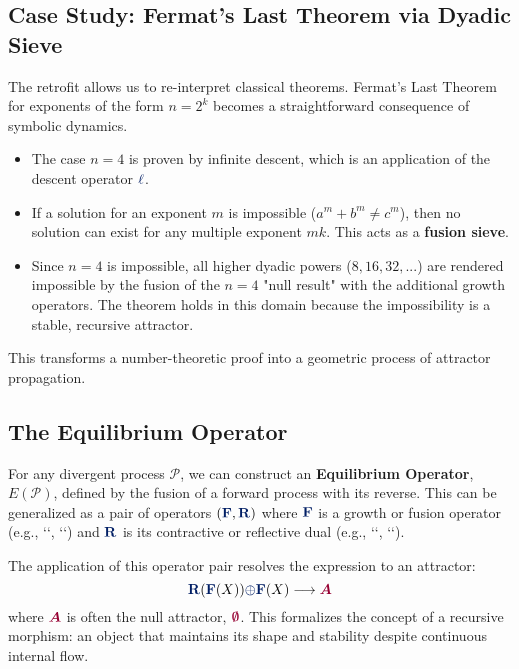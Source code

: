 \subsection{Case Study: Fermat's Last Theorem via Dyadic Sieve}
The retrofit allows us to re-interpret classical theorems. Fermat's Last Theorem for exponents of the form $n=2^k$ becomes a straightforward consequence of symbolic dynamics.
\begin{itemize}
    \item The case $n=4$ is proven by infinite descent, which is an application of the descent operator $\lha$.
    \item If a solution for an exponent $m$ is impossible ($a^m+b^m \neq c^m$), then no solution can exist for any multiple exponent $mk$. This acts as a \textbf{fusion sieve}.
    \item Since $n=4$ is impossible, all higher dyadic powers ($8, 16, 32, ...$) are rendered impossible by the fusion of the $n=4$ "null result" with the additional growth operators. The theorem holds in this domain because the impossibility is a stable, recursive attractor.
\end{itemize}
This transforms a number-theoretic proof into a geometric process of attractor propagation.

\subsection{The Equilibrium Operator}
For any divergent process $\mathcal{P}$, we can construct an \textbf{Equilibrium Operator}, $E(\mathcal{P})$, defined by the fusion of a forward process with its reverse. This can be generalized as a pair of operators $(\op{F}, \op{R})$ where $\op{F}$ is a growth or fusion operator (e.g., `\grow`, `\fuse`) and $\op{R}$ is its contractive or reflective dual (e.g., `\lha`, ``).

The application of this operator pair resolves the expression to an attractor:
\[ \op{R}(\op{F}(X)) \fuse \op{F}(X) \longrightarrow \att{A} \]
where $\att{A}$ is often the null attractor, $\void$. This formalizes the concept of a recursive morphism: an object that maintains its shape and stability despite continuous internal flow.


